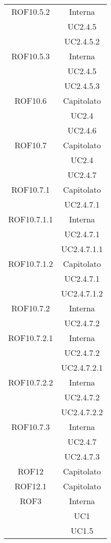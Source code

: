 \begin{longtable}{|c|c|}
\midrule
ROF10.5.2
& Interna\\
& UC2.4.5\\
& UC2.4.5.2\\

\midrule
ROF10.5.3
& Interna\\
& UC2.4.5\\
& UC2.4.5.3\\

\midrule
ROF10.6
& Capitolato\\
& UC2.4\\
& UC2.4.6\\

\midrule
ROF10.7
& Capitolato\\
& UC2.4\\
& UC2.4.7\\

\midrule
ROF10.7.1
& Capitolato\\
& UC2.4.7.1\\

\midrule
ROF10.7.1.1
& Interna\\
& UC2.4.7.1\\
& UC2.4.7.1.1\\

\midrule
ROF10.7.1.2
& Capitolato\\
& UC2.4.7.1\\
& UC2.4.7.1.2\\

\midrule
ROF10.7.2
& Interna\\
& UC2.4.7.2\\

\midrule
ROF10.7.2.1
& Interna\\
& UC2.4.7.2\\
& UC2.4.7.2.1\\

\midrule
ROF10.7.2.2
& Interna\\
& UC2.4.7.2\\
& UC2.4.7.2.2\\

\midrule
ROF10.7.3
& Interna\\
& UC2.4.7\\
& UC2.4.7.3\\

\midrule
ROF12
& Capitolato\\

\midrule
ROF12.1
& Capitolato\\

\midrule
ROF3
& Interna\\
& UC1\\
& UC1.5\\


\end{longtable}
